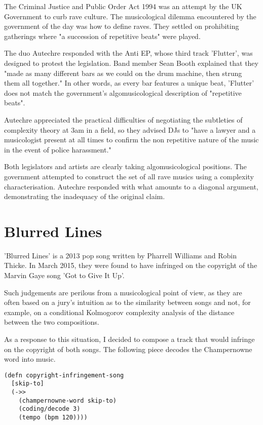 \documentclass[numbers]{sigplanconf}
\begin{document}
The Criminal Justice and Public Order Act 1994 was an attempt by the UK Government to curb rave culture. The musicological
dilemma encountered by the government of the day was how to define raves. They settled on prohibiting gatherings where
"a succession of repetitive beats" were played.

The duo Autechre responded with the Anti EP, whose third track 'Flutter', was designed to protest the legislation. Band member
Sean Booth explained that they "made as many different bars as we could on the drum machine, then strung them all together."
In other words, as every bar features a unique beat, 'Flutter' does not match the government's algomusicological description
of "repetitive beats".

Autechre appreciated the practical difficulties of negotiating the subtleties of complexity theory at 3am in a field,
so they advised DJs to "have a lawyer and a musicologist present at all times to confirm the non repetitive nature of the
music in the event of police harassment."

Both legislators and artists are clearly taking algomusicological positions. The government attempted to construct the set
of all rave musics using a complexity characterisation. Autechre responded with what amounts to a diagonal argument, demonstrating
the inadequacy of the original claim.

\section{Blurred Lines}

'Blurred Lines' is a 2013 pop song written by Pharrell Williams and Robin Thicke. In March 2015,
they were found to have infringed on the copyright of the Marvin Gaye song 'Got to Give It Up'.

Such judgements are perilous from a musicological point of view, as they are often based on a jury's intuition as to
the similarity between songs and not, for example, on a conditional Kolmogorov complexity analysis of the distance between
the two compositions.

As a response to this situation, I decided to compose a track that would infringe on the copyright of both songs. The following
piece decodes the Champernowne word into music.

\begin{verbatim}
(defn copyright-infringement-song
  [skip-to]
  (->>
    (champernowne-word skip-to)
    (coding/decode 3)
    (tempo (bpm 120))))
\end{verbatim}
\end{document}
